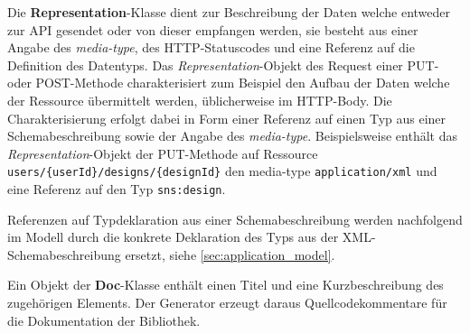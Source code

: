 Die \textbf{Representation}-Klasse dient zur Beschreibung der Daten welche entweder zur API gesendet oder von dieser empfangen werden, sie besteht aus einer Angabe des \emph{media-type}, des HTTP-Statuscodes und eine Referenz auf die Definition des Datentyps. Das \emph{Representation}-Objekt des Request einer PUT- oder POST-Methode charakterisiert zum Beispiel den Aufbau der Daten welche der Ressource übermittelt werden, üblicherweise im HTTP-Body. Die Charakterisierung erfolgt dabei in Form einer Referenz auf einen Typ aus einer Schemabeschreibung sowie der Angabe des \emph{media-type}. Beispielsweise enthält das \emph{Representation}-Objekt der PUT-Methode auf Ressource \texttt{users/\{userId\}/designs/\{designId\}} den media-type \texttt{application/xml} und eine Referenz auf den Typ \texttt{sns:design}. 

Referenzen auf Typdeklaration aus einer Schemabeschreibung werden nachfolgend im Modell durch die konkrete Deklaration des Typs aus der XML-Schemabeschreibung ersetzt, siehe \cref{sec:application_model}. 

Ein Objekt der \textbf{Doc}-Klasse enthält einen Titel und eine Kurzbeschreibung des zugehörigen Elements.
Der Generator erzeugt daraus Quellcodekommentare für die Dokumentation der Bibliothek.